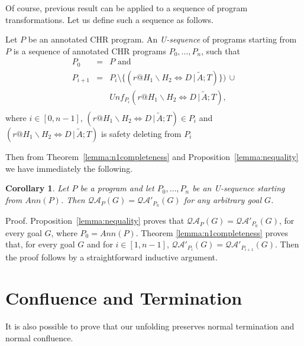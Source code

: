 \documentclass[final]{acmtrans2e}
\newtheorem{corollary}[theorem]{Corollary}
\begin{document}
\noindent{$\Box$}



Of course, previous result can be applied to a sequence of program transformations.
Let us define such a sequence as follows.

\begin{definition}[U-sequence]\label{def:uno}
Let $P$ be an annotated CHR program. An \emph{U-sequence} of programs
starting from $P$ is a sequence of annotated CHR programs $P_0, \ldots,
P_n$, such that
\[
\begin{array}{lll}
  P_0 & = & P  \mbox{ and }\\
  P_{i+1}& = &  P_i \setminus   \{(r@H_1\backslash H_2 \Leftrightarrow D\,|\,\tilde A; T)\} ) \, \cup\\
  &  & Unf_{P_i}(r@H_1\backslash H_2 \Leftrightarrow D\,|\,\tilde A; T), \\
\end{array}
 \]
 where $i \in [0,n-1]$, $(r@H_1\backslash H_2 \Leftrightarrow D\,|\,\tilde A;
 T)\in P_i$ and $(r@H_1\backslash H_2 \Leftrightarrow D\,|\,\tilde A;
 T)$  is
safety deleting from $P_i$
\end{definition}

Then from  Theorem~\ref{lemma:n1completeness} and
Proposition~\ref{lemma:nequality} we have immediately the
following.

\begin{corollary}\label{lemma:ncompleteness}
Let $P$ be a program and let $P_0, \ldots, P_n$ be an U-sequence starting from $Ann(P)$. Then
$\mathcal{QA}_{P}(G)=\mathcal{QA'}_{P_n}(G)$ for any arbitrary goal
$G$.
\end{corollary}

{\sc Proof.} Proposition~\ref{lemma:nequality} proves that $\mathcal{QA}_{P}(G)=\mathcal{QA}'_{P_0}(G)$, for every goal $G$, where  $P_0=Ann(P)$.
Theorem \ref{lemma:n1completeness} proves that, for every goal $G$ and for $i \in [1, n-1]$,
$\mathcal{QA}'_{P_i}(G)=\mathcal{QA}'_{P_{i+1}}(G)$. Then the proof follows by a straightforward inductive argument.
\\
\noindent{$\Box$}


\section{Confluence and Termination}\label{sec:confluence&termination}

It is also possible to prove that our unfolding preserves normal termination and normal confluence.
\end{document}
